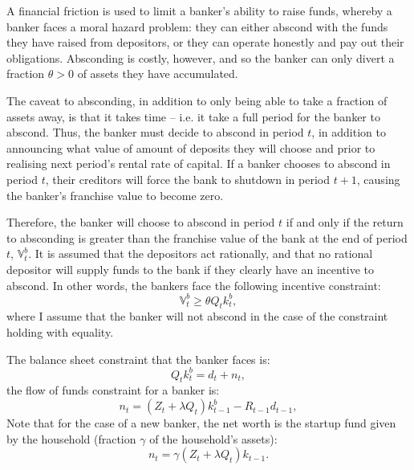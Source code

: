 \documentclass[12pt,english]{extarticle}
\begin{document}
	A financial friction is used to limit a banker's ability to raise funds, whereby a banker faces a moral hazard problem: they can either abscond with the funds they have raised from depositors, or they can operate honestly and pay out their obligations. Absconding is costly, however, and so the banker can only divert a fraction $\theta > 0$ of assets they have accumulated.
	
	The caveat to absconding, in addition to only being able to take a fraction of assets away, is that it takes time -- i.e. it take a full period for the banker to abscond. Thus, the banker must decide to abscond in period $t$, in addition to announcing what value of amount of deposits they will choose and prior to realising next period's rental rate of capital. If a banker chooses to abscond in period $t$, their creditors will force the bank to shutdown in period $t+1$, causing the banker's franchise value to become zero.
	
	Therefore, the banker will choose to abscond in period $t$ if and only if the return to absconding is greater than the franchise value of the bank at the end of period $t$, $\mathbb{V}_t^b$. It is assumed that the depositors act rationally, and that no rational depositor will supply funds to the bank if they clearly have an incentive to abscond. In other words, the bankers face the following incentive constraint:
	\begin{equation*}
		\mathbb{V}_t^b \geq \theta Q_tk_t^b,
	\end{equation*}
	where I assume that the banker will not abscond in the case of the constraint holding with equality.
	
	The balance sheet constraint that the banker faces is:
	\begin{equation*}
		Q_tk_t^b = d_t + n_t,
	\end{equation*}
	the flow of funds constraint for a banker is:
	\begin{equation*}
		n_t = (Z_t + \lambda Q_t)k_{t-1}^b - R_{t-1}d_{t-1},
	\end{equation*}
	Note that for the case of a new banker, the net worth is the startup fund given by the household (fraction $\gamma$ of the household's assets):
	\begin{equation*}
		n_t = \gamma\left(Z_t + \lambda Q_t\right)k_{t-1}.
	\end{equation*}
	
\end{document}
